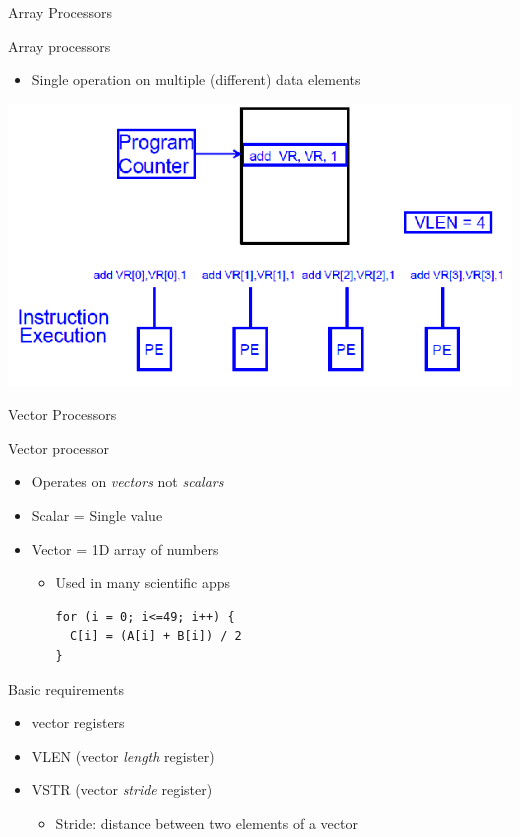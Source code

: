 \documentclass[presentation]{beamer}
\begin{document}
\begin{frame}[label={sec:org3403eb6}]{Array Processors}
\begin{block}{Array processors}
\begin{itemize}
\item Single operation on multiple (different) data elements
\end{itemize}
\pause
\end{block}

\begin{block}{}
\begin{center}
\includegraphics[width=.9\linewidth]{./images/slides_SIMD_21_small.png}
\end{center}
\end{block}
\end{frame}


\begin{frame}[label={sec:org75ee41c},fragile]{Vector Processors}
 \begin{block}{Vector processor}
\begin{itemize}
\item Operates on \emph{vectors} not \emph{scalars}
\item Scalar = Single value
\item Vector = 1D array of numbers
\begin{itemize}
\item Used in many scientific apps
\lstset{language=C,label= ,caption= ,captionpos=b,numbers=none}
\begin{lstlisting}
for (i = 0; i<=49; i++) {
  C[i] = (A[i] + B[i]) / 2
}
\end{lstlisting}
\end{itemize}
\end{itemize}
\pause
\end{block}
\begin{block}{Basic requirements}
\begin{itemize}
\item \alert{vector} registers
\item \alert{VLEN} (vector \emph{length} register)
\item \alert{VSTR} (vector \emph{stride} register)
\begin{itemize}
\item Stride: distance between two elements of a vector
\end{itemize}
\end{itemize}
\end{block}
\end{frame}
\end{document}
